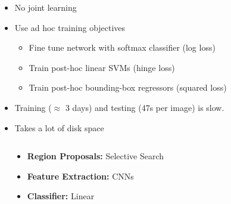 \begin{frame}
\begin{columns}
		\begin{overlayarea}{\textwidth}{\textheight}  
			\begin{itemize}
				\justifying
				\item No joint learning 
				\item<2-> Use ad hoc training objectives
				\begin{itemize}
			      	\justifying
			      	\item<3-> Fine tune network with softmax classifier (log loss)
			      	\item<4-> Train post-hoc linear SVMs (hinge loss)
			      	\item<5-> Train post-hoc bounding-box regressors (squared loss)
				\end{itemize}
				\item<6-> Training ($\approx$ 3 days) and testing (47s per image) is slow\footnotemark.
				\item<7-> Takes a lot of disk space
			\end{itemize}
		\end{overlayarea}
        
	\end{columns}
	\vspace{-1cm}
\end{frame}


\begin{frame}
	\begin{columns}
		\begin{overlayarea}{\textwidth}{\textheight}
			
		\end{overlayarea}
		\begin{overlayarea}{\textwidth}{\textheight}
			\begin{itemize}
				\item<1-> \textbf{Region Proposals:} Selective Search
				\item<2-> \textbf{Feature Extraction:} CNNs
				\item<3-> \textbf{Classifier:} Linear 
			\end{itemize}
		\end{overlayarea}
	\end{columns}
\end{frame}

